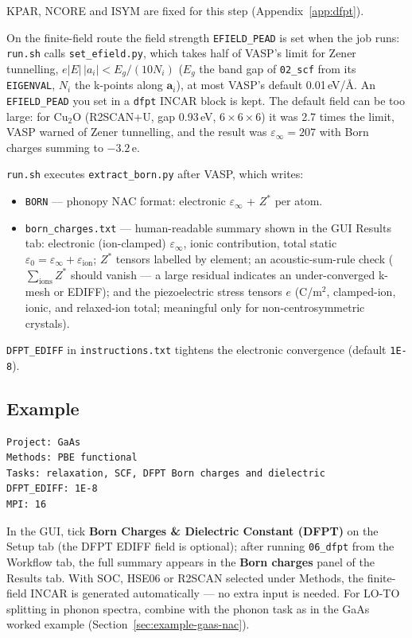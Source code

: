 \documentclass[11pt,a4paper]{scrartcl}
\begin{document}
KPAR, NCORE and ISYM are fixed for this step (Appendix~\ref{app:dfpt}).

On the finite-field route the field strength \texttt{EFIELD\_PEAD} is set
when the job runs: \texttt{run.sh} calls \texttt{set\_efield.py}, which takes
half of VASP's limit for Zener tunnelling,
$e|E|\,|a_i| < E_g/(10N_i)$ ($E_g$ the band gap of \texttt{02\_scf} from its
\texttt{EIGENVAL}, $N_i$ the k-points along $\mathbf{a}_i$), at most VASP's
default 0.01\,eV/\AA.  An \texttt{EFIELD\_PEAD} you set in a \texttt{dfpt}
INCAR block is kept.  The default field can be too large: for Cu$_2$O
(R2SCAN+U, gap 0.93\,eV, $6\times6\times6$) it was 2.7 times the limit, VASP
warned of Zener tunnelling, and the result was $\varepsilon_\infty = 207$
with Born charges summing to $-3.2$\,e.

\texttt{run.sh} executes \texttt{extract\_born.py} after VASP, which
writes:

\begin{itemize}
  \item \texttt{BORN} --- phonopy NAC format: electronic
        $\varepsilon_{\infty}$ + $Z^{*}$ per atom.
  \item \texttt{born\_charges.txt} --- human-readable summary shown in
        the GUI Results tab: electronic (ion-clamped)
        $\varepsilon_{\infty}$, ionic contribution, total static
        $\varepsilon_{0}=\varepsilon_{\infty}+\varepsilon_{\mathrm{ion}}$;
        $Z^{*}$ tensors labelled by element; an acoustic-sum-rule check
        ($\sum_{\mathrm{ions}} Z^{*}$ should vanish --- a large residual
        indicates an under-converged k-mesh or EDIFF); and the
        piezoelectric stress tensors $e$ (C/m$^2$, clamped-ion, ionic,
        and relaxed-ion total; meaningful only for non-centrosymmetric
        crystals).
\end{itemize}

\texttt{DFPT\_EDIFF} in \texttt{instructions.txt} tightens the
electronic convergence (default \texttt{1E-8}).

\subsection{Example}

\begin{lstlisting}
Project: GaAs
Methods: PBE functional
Tasks: relaxation, SCF, DFPT Born charges and dielectric
DFPT_EDIFF: 1E-8
MPI: 16
\end{lstlisting}

In the GUI, tick \textbf{Born Charges \& Dielectric Constant (DFPT)} on
the Setup tab (the DFPT EDIFF field is optional); after running
\texttt{06\_dfpt} from the Workflow tab, the full summary appears in
the \textbf{Born charges} panel of the Results tab.  With SOC, HSE06
or R2SCAN selected under Methods, the finite-field INCAR is generated
automatically --- no extra input is needed.  For LO-TO splitting in
phonon spectra, combine with the phonon task as in the GaAs worked
example (Section~\ref{sec:example-gaas-nac}).
\end{document}
